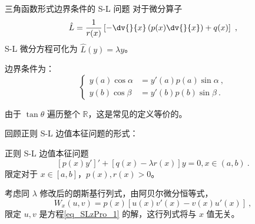 

\begin{issues}
\issueDraft
\issueTODO
\end{issues}


\begin{definition}{三角函数形式边界条件的 S-L 问题}
对于微分算子
\begin{equation}
\hat L = \frac{1}{r(x)} \left[-\dv{}{x}\left(p(x)\dv{}{x}\right) + q(x)\right] ~,
\end{equation}
S-L 微分方程可化为 $\hat L (y) = \lambda y$。

边界条件为：
\begin{equation}
\left\{\begin{aligned}
y(a) \cos \alpha &= y'(a) p(a) \sin \alpha ~, \\
y(b) \cos \beta &= y'(b) p(b) \sin \beta ~.
\end{aligned}\right.
\end{equation}

由于 $\tan \theta$ 遍历整个 $\mathbb R$，这是常见的定义等价的。

\end{definition}

回顾正则 S-L 边值本征问题的形式：
\begin{definition}{正则 S-L 边值本征问题}
\begin{equation}\label{eq_SLzPro_1}
[p(x) y']' + [q(x) - \lambda r(x)] y = 0, x \in (a, b) ~.
\end{equation}
限定对于 $x \in [a, b]$，$p(x) , r(x) > 0$。
\end{definition}
考虑同 $\lambda$ 修改后的朗斯基行列式，由阿贝尔微分恒等式，
\begin{equation}
W_x(u, v) = p(x) [u(x) v'(x) - v(x) u'(x)] ~,
\end{equation}
限定 $u, v$ 是方程\autoref{eq_SLzPro_1} 的解，这行列式将与 $x$ 值无关。

